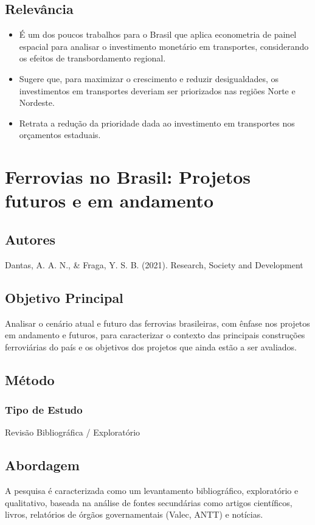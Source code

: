 \documentclass[12pt]{article}
\begin{document}
\subsection*{Relevância}
\begin{itemize}
    \item É um dos poucos trabalhos para o Brasil que aplica econometria de painel espacial para analisar o investimento monetário em transportes, considerando os efeitos de transbordamento regional.
    \item  Sugere que, para maximizar o crescimento e reduzir desigualdades, os investimentos em transportes deveriam ser priorizados nas regiões Norte e Nordeste.
    \item Retrata a redução da prioridade dada ao investimento em transportes nos orçamentos estaduais.
\end{itemize}
\newpage
\section{Ferrovias no Brasil: Projetos futuros e em andamento}

\subsection*{Autores}
Dantas, A. A. N., \& Fraga, Y. S. B. (2021). Research, Society and Development

\subsection*{Objetivo Principal}
Analisar o cenário atual e futuro das ferrovias brasileiras, com ênfase nos projetos em andamento e futuros, para caracterizar o contexto das principais construções ferroviárias do país e os objetivos dos projetos que ainda estão a ser avaliados.


\subsection*{Método}

\subsubsection*{Tipo de Estudo}
Revisão Bibliográfica / Exploratório

\subsection*{Abordagem}
A pesquisa é caracterizada como um levantamento bibliográfico, exploratório e qualitativo, baseada na análise de fontes secundárias como artigos científicos, livros, relatórios de órgãos governamentais (Valec, ANTT) e notícias.
\end{document}

